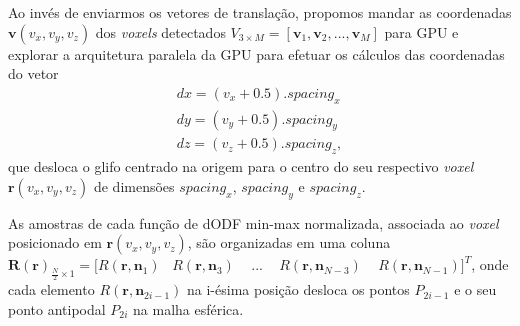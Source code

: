 Ao invés de enviarmos os vetores de translação, propomos mandar 
as coordenadas $\mathbf{v}(v_x, v_y, v_z)$ dos \textit{voxels} detectados $V_{3 \times M} = [
\mathbf{v}_1,
\mathbf{v}_2, ..., 
\mathbf{v}_M
]$ para GPU e explorar a arquitetura paralela da GPU para efetuar 
os cálculos das coordenadas do vetor
\begin{align}
 \label{eq::translation}
    dx = (v_x + 0.5).spacing_x \nonumber\\
    dy = (v_y + 0.5).spacing_y \\
    dz = (v_z + 0.5).spacing_z \nonumber,
\end{align}
que desloca o glifo centrado na origem para o centro do seu respectivo \textit{voxel} $\mathbf{r}(v_x, v_y, v_z)$ de dimensões $spacing_x$, $spacing_y$ e $spacing_z$.



As amostras de cada função de dODF min-max normalizada, associada ao \textit{voxel} posicionado em $\mathbf{r}(v_x, v_y, v_z)$, são organizadas em uma coluna $\boldsymbol{R}(\mathbf{r})_{\frac{N}{2} \times 1} = [
R(\mathbf{r}, \mathbf{n}_1)$~
$R(\mathbf{r}, \mathbf{n}_3)$ ~ ... ~
$R(\mathbf{r}, \mathbf{n}_{N-3})$ ~
$R(\mathbf{r}, \mathbf{n}_{N-1})]^T$, onde cada elemento $R(\mathbf{r}, \mathbf{n}_{2i-1})$  na i-ésima posição desloca os pontos $P_{2i-1}$ e o seu ponto antipodal $P_{2i}$ na malha esférica.

